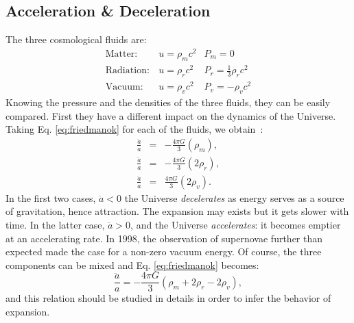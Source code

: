 \subsection{Acceleration \& Deceleration} %
\label{sub:comparing_the_fluids}
The three cosmological fluids are:
\begin{eqnarray}
	\mathrm{Matter :}&u=\rho_m c^2&P_m=0\\
	\mathrm{Radiation :}&u=\rho_r c^2&P_r=\frac{1}{3}\rho_r c^2\\
	\mathrm{Vacuum :}&u=\rho_v c^2&P_v=-\rho_v c^2
\end{eqnarray}
Knowing the pressure and the densities of the three fluids, they can be easily compared. First they have a different impact on the dynamics of the Universe. Taking Eq. \ref{eq:friedmanok} for each of the fluids, we obtain~:
\begin{eqnarray}
	\frac{\ddot a}{a}&=&-\frac{4\pi G}{3}(\rho_m),\\
	\frac{\ddot a}{a}&=&-\frac{4\pi G}{3}(2\rho_r),\\
	\frac{\ddot a}{a}&=&\frac{4\pi G}{3}(2\rho_v).
\end{eqnarray}
In the first two cases, $\ddot a<0$ the Universe \emph{decelerates} as energy serves as a source of gravitation, hence attraction. The expansion may exists but it gets slower with time. In the latter case, $\ddot a>0$, and the Universe \emph{accelerates}: it becomes emptier at an accelerating rate. In 1998, the observation of supernovae further than expected made the case for a non-zero vacuum energy. Of course, the three components can be mixed and Eq. \ref{eq:friedmanok} becomes:
\begin{equation}
		\frac{\ddot a}{a}=-\frac{4\pi G}{3}(\rho_m+2\rho_r-2\rho_v),
\end{equation}
and this relation should be studied in details in order to infer the behavior of expansion.
